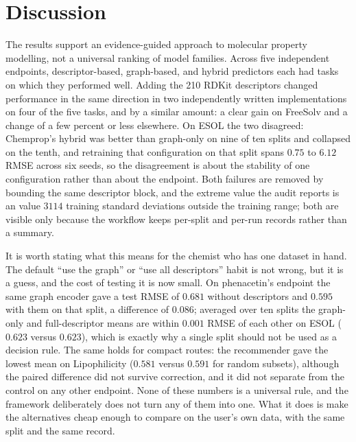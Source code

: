 \section{Discussion}\label{sec:discussion}

The results support an evidence-guided approach to molecular property modelling, not a universal ranking of model families. Across five independent endpoints, descriptor-based, graph-based, and hybrid predictors each had tasks on which they performed well. Adding the 210 RDKit descriptors changed performance in the same direction in two independently written implementations on four of the five tasks, and by a similar amount: a clear gain on FreeSolv and a change of a few percent or less elsewhere. On ESOL the two disagreed: Chemprop's hybrid was better than graph-only on nine of ten splits and collapsed on the tenth, and retraining that configuration on that split spans $0.75$ to $6.12$ RMSE across six seeds, so the disagreement is about the stability of one configuration rather than about the endpoint. Both failures are removed by bounding the same descriptor block, and the extreme value the audit reports is an  value $3114$ training standard deviations outside the training range; both are visible only because the workflow keeps per-split and per-run records rather than a summary.

It is worth stating what this means for the chemist who has one dataset in hand. The default ``use the graph'' or ``use all descriptors'' habit is not wrong, but it is a guess, and the cost of testing it is now small. On phenacetin's endpoint the same graph encoder gave a test RMSE of $0.681$ without descriptors and $0.595$ with them on that split, a difference of $0.086$; averaged over ten splits the graph-only and full-descriptor means are within $0.001$ RMSE of each other on ESOL ($0.623$ versus $0.623$), which is exactly why a single split should not be used as a decision rule. The same holds for compact routes: the recommender gave the lowest mean on Lipophilicity ($0.581$ versus $0.591$ for random subsets), although the paired difference did not survive correction, and it did not separate from the control on any other endpoint. None of these numbers is a universal rule, and the framework deliberately does not turn any of them into one. What it does is make the alternatives cheap enough to compare on the user's own data, with the same split and the same record.

